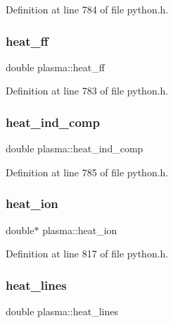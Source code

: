 Definition at line 784 of file python.\+h.

\mbox{\label{structplasma_aadd0d71f61d6ed95a48af999a14784e0}} 
\subsubsection{\texorpdfstring{heat\+\_\+ff}{heat\_ff}}
{\footnotesize\ttfamily double plasma\+::heat\+\_\+ff}



Definition at line 783 of file python.\+h.

\mbox{\label{structplasma_af28aff5f32398a703d1423c56a4599c2}} 
\subsubsection{\texorpdfstring{heat\+\_\+ind\+\_\+comp}{heat\_ind\_comp}}
{\footnotesize\ttfamily double plasma\+::heat\+\_\+ind\+\_\+comp}



Definition at line 785 of file python.\+h.

\mbox{\label{structplasma_a1cff49185ad30a6734089a2d2c949fbc}} 
\subsubsection{\texorpdfstring{heat\+\_\+ion}{heat\_ion}}
{\footnotesize\ttfamily double$\ast$ plasma\+::heat\+\_\+ion}



Definition at line 817 of file python.\+h.

\mbox{\label{structplasma_ab2b017d6fa0e646a4a1d880d49914ef2}} 
\subsubsection{\texorpdfstring{heat\+\_\+lines}{heat\_lines}}
{\footnotesize\ttfamily double plasma\+::heat\+\_\+lines}



